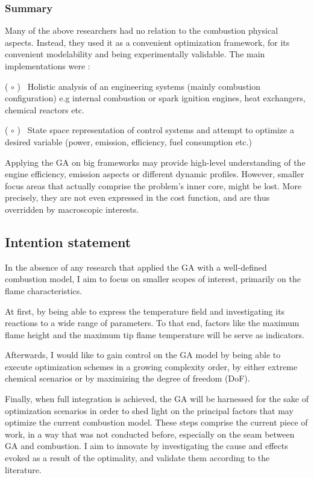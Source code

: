 \documentclass[12pt]{article}
\numberwithin{equation}{section}
\begin{document}
\begin{flushleft}
\subsubsection*{Summary}

Many of the above researchers had no relation to the combustion physical aspects. Instead, they used it as a convenient optimization framework, for its convenient modelability and being experimentally validable. The main implementations were :

( $ \circ $ ) \ Holistic analysis of an engineering systems (mainly combustion configuration) e.g internal combustion or spark ignition engines, heat exchangers, chemical reactors etc.

( $ \circ $ ) \ State space representation of control systems and attempt to optimize a desired variable (power, emission, efficiency, fuel consumption etc.)

Applying the GA on big frameworks may provide high-level understanding of the engine efficiency, emission aspects or different dynamic profiles. However, smaller focus areas that actually comprise the problem's inner core, might be lost. More precisely, they are not even expressed in the cost function, and are thus overridden by macroscopic interests.

\subsection{Intention statement}

In the absence of any research that applied the GA with a well-defined combustion model, I aim to focus on smaller scopes of interest, primarily on the flame characteristics. 

At first, by being able to express the temperature field and investigating its reactions to a wide range of parameters. To that end, factors like the maximum flame height and the maximum tip flame temperature will be serve as indicators.

Afterwards, I would like to gain control on the GA model by being able to execute optimization schemes in a growing complexity order, by either extreme chemical scenarios or by maximizing the degree of freedom (DoF).

Finally, when full integration is achieved, the GA will be harnessed for the sake of optimization scenarios in order to shed light on the principal factors that may optimize the current combustion model. These steps comprise the current piece of work, in a way that was not conducted before, especially on the seam between GA and combustion. 
I aim to innovate by investigating the cause and effects evoked as a result of the optimality, and validate them according to the literature.


\end{flushleft}
\end{document}
